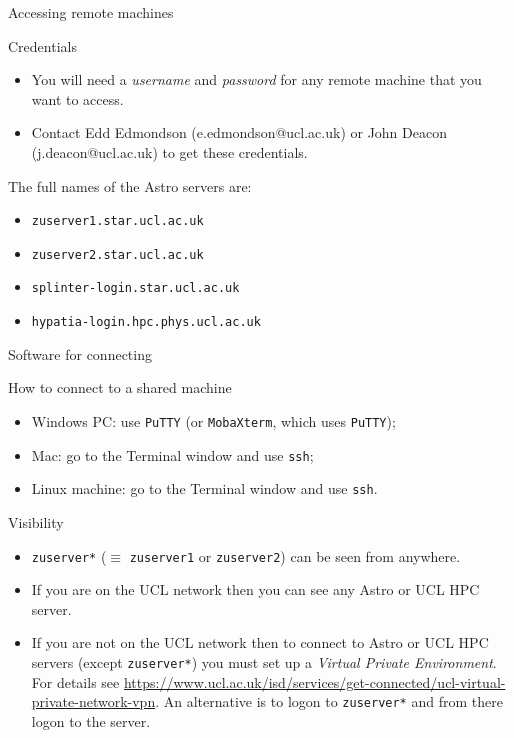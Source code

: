 \documentclass[dvipsnames]{beamer}
\newcommand{\command}[1]{\colorbox{light-gray}{\texttt{#1}}}
\newcommand{\server}[1]{\textcolor{BrickRed}{\texttt{#1}}}
\begin{document}
\begin{frame}{Accessing remote machines}
  \begin{block}{Credentials}
    \begin{itemize}
      \item You will need a \textit{username} and \textit{password} for any remote machine that you want to access.
      \item Contact Edd Edmondson (e.edmondson@ucl.ac.uk) or John Deacon (j.deacon@ucl.ac.uk) to get these credentials.
    \end{itemize}
  \end{block}
  \begin{block}{The full names of the Astro servers are:}
    \begin{itemize}
      \item \server{zuserver1.star.ucl.ac.uk}
      \item \server{zuserver2.star.ucl.ac.uk}
      \item \server{splinter-login.star.ucl.ac.uk}
      \item \server{hypatia-login.hpc.phys.ucl.ac.uk}
    \end{itemize}
  \end{block}
\end{frame}


\begin{frame}{Software for connecting}
  \begin{block}{How to connect to a shared machine}
    \begin{itemize}
      \item Windows PC: use \command{PuTTY} (or \command{MobaXterm}, which uses \command{PuTTY});
      \item Mac: go to the Terminal window and use \command{ssh};
      \item Linux machine: go to the Terminal window and use \command{ssh}.
    \end{itemize}
  \end{block}
\end{frame}


\begin{frame}{Visibility}
  \begin{block}{}
    \begin{itemize}
    \item \server{zuserver*} ($\equiv$ \server{zuserver1} or \server{zuserver2}) can be seen from anywhere.
    \item If you are on the UCL network then you can see any Astro or UCL HPC server.
    \item If you are not on the UCL network then to connect to Astro or UCL HPC servers (except \server{zuserver*}) you must set up a \textit{Virtual Private Environment}. For details see \url{https://www.ucl.ac.uk/isd/services/get-connected/ucl-virtual-private-network-vpn}. An alternative is to logon to \server{zuserver*} and from there logon to the server.
    \end{itemize}
  \end{block}
\end{frame}
\end{document}

